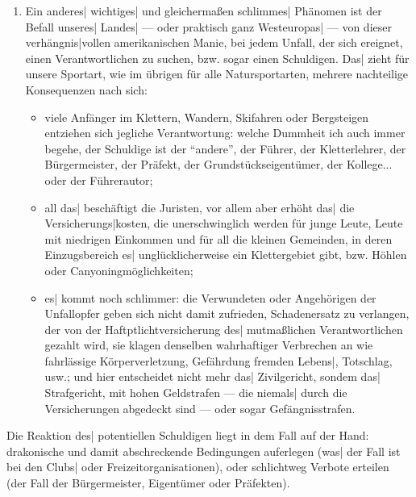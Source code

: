 \documentclass[12pt]{article}
\def\3{\ss}
\begin{document}
\begin{enumerate}
\begin{itemize}
 \end{itemize}

 \item Ein anderes| wichtiges| und gleicherma\3en schlimmes| Ph\"anomen ist
der Befall unseres| Landes| --- oder praktisch ganz Westeuropas| --- von
dieser verh\"angnis|vollen amerikanischen Manie, bei jedem Unfall, der sich
ereignet, einen Verantwortlichen zu suchen, bzw. sogar einen Schuldigen. Das|
zieht f\"ur unsere Sportart, wie im \"ubrigen f\"ur alle Natursportarten,
mehrere nachteilige Konsequenzen nach sich:


 \begin{itemize}
 \item viele Anf\"anger im Klettern, Wandern, Skifahren oder Bergsteigen
entziehen sich
jegliche Verantwortung: welche Dummheit ich auch immer begehe, der
Schuldige ist der ``andere'', der F\"uhrer, der Kletterlehrer, der
B\"urgermeister, der Pr\"afekt, der Grundst\"uckseigent\"umer, der Kollege... oder der
F\"uhrerautor;

 \item all das| besch\"aftigt die Juristen, vor allem aber erh\"oht das| die
Versicherungs|kosten, die unerschwinglich werden f\"ur junge Leute, Leute mit
niedrigen Einkommen und f\"ur all die kleinen Gemeinden, in deren
Einzugsbereich es| ungl\"ucklicherweise ein Klettergebiet gibt, bzw. H\"ohlen
oder Canyoningm\"oglichkeiten;

 \item es| kommt noch schlimmer: die Verwundeten oder Angeh\"origen der
Unfallopfer geben sich nicht damit zufrieden, Schadenersatz zu
verlangen, der von der Haftptlichtversicherung des| mutma\3lichen
Verantwortlichen gezahlt wird, sie klagen denselben wahrhaftiger
Verbrechen an wie fahrl\"assige K\"orperverletzung, Gef\"ahrdung fremden
Lebens|, Totschlag, usw.; und hier entscheidet nicht mehr das|
Zivilgericht, sondem das| Strafgericht, mit hohen Geldstrafen --- die niemals|
durch die Versicherungen abgedeckt sind --- oder sogar Gef\"angnisstrafen.
  \end{itemize}

\end{enumerate}

 Die Reaktion des| potentiellen Schuldigen liegt in dem Fall auf der Hand:
drakonische und damit abschreckende Bedingungen auferlegen (was| der
Fall ist bei den Clubs| oder Freizeitorganisationen), oder schlichtweg Verbote
erteilen (der Fall der B\"urgermeister, Eigent\"umer oder Pr\"afekten).
  
\end{document}
